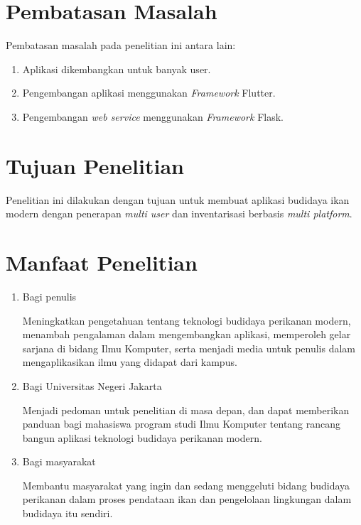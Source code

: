 \section{Pembatasan Masalah}
Pembatasan masalah pada penelitian ini antara lain:
\begin{enumerate}
	\item Aplikasi dikembangkan untuk banyak user.
	\item Pengembangan aplikasi menggunakan \emph{Framework} Flutter.
	\item Pengembangan \emph{web service} menggunakan \emph{Framework} Flask.
\end{enumerate}

\section{Tujuan Penelitian}
	Penelitian ini dilakukan dengan tujuan untuk membuat aplikasi budidaya ikan modern dengan penerapan \emph{multi user} dan inventarisasi berbasis \emph{multi platform}.

\section{Manfaat Penelitian}
\begin{enumerate}
	\item Bagi penulis
		
	Meningkatkan pengetahuan tentang teknologi budidaya perikanan modern, menambah pengalaman dalam mengembangkan aplikasi, memperoleh gelar sarjana di bidang Ilmu Komputer, serta menjadi media untuk penulis dalam mengaplikasikan ilmu yang didapat dari kampus.
		
	\item Bagi Universitas Negeri Jakarta
	 	
	Menjadi pedoman untuk penelitian di masa depan, dan dapat memberikan panduan bagi mahasiswa program studi Ilmu Komputer tentang rancang bangun aplikasi teknologi budidaya perikanan modern.
	
	\item Bagi masyarakat
	 	
	Membantu masyarakat yang ingin dan sedang menggeluti bidang budidaya perikanan dalam proses pendataan ikan dan pengelolaan lingkungan dalam budidaya itu sendiri.
	 			
\end{enumerate}


\begin{comment}

\end{comment}
